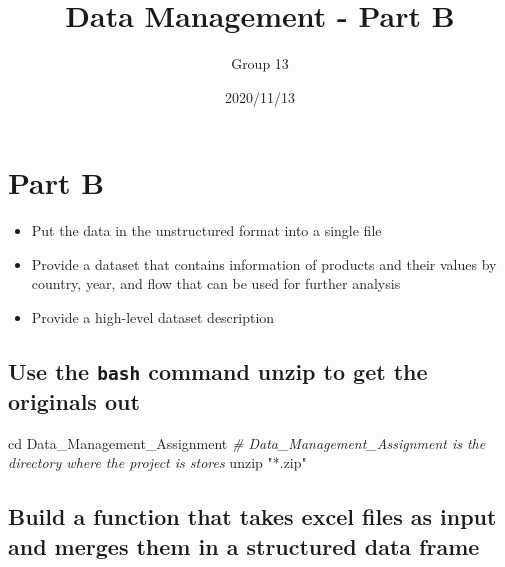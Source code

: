 \documentclass[
]{article}
\title{Data Management - Part B}
\author{Group 13}
\date{2020/11/13}
\newenvironment{Shaded}{\begin{snugshade}}{\end{snugshade}}
\newcommand{\BuiltInTok}[1]{#1}
\newcommand{\CommentTok}[1]{\textcolor[rgb]{0.56,0.35,0.01}{\textit{#1}}}
\newcommand{\FunctionTok}[1]{\textcolor[rgb]{0.00,0.00,0.00}{#1}}
\newcommand{\NormalTok}[1]{#1}
\newcommand{\StringTok}[1]{\textcolor[rgb]{0.31,0.60,0.02}{#1}}
\providecommand{\tightlist}{%
  \setlength{\itemsep}{0pt}\setlength{\parskip}{0pt}}
\begin{document}
\maketitle

{
\setcounter{tocdepth}{2}
\tableofcontents
}
\newpage

\hypertarget{part-b}{%
\section{Part B}\label{part-b}}

\begin{itemize}
\tightlist
\item
  Put the data in the unstructured format into a single file
\item
  Provide a dataset that contains information of products and their
  values by country, year, and flow that can be used for further
  analysis
\item
  Provide a high-level dataset description
\end{itemize}

\hypertarget{use-the-bash-command-unzip-to-get-the-originals-out}{%
\subsection{\texorpdfstring{Use the \texttt{bash} command unzip to get
the originals
out}{Use the bash command unzip to get the originals out}}\label{use-the-bash-command-unzip-to-get-the-originals-out}}

\begin{Shaded}
\begin{Highlighting}[]
\BuiltInTok{cd}\NormalTok{ Data_Management_Assignment }\CommentTok{# Data_Management_Assignment is the directory where the project is stores}
\FunctionTok{unzip} \StringTok{"*.zip"}
\end{Highlighting}
\end{Shaded}

\hypertarget{build-a-function-that-takes-excel-files-as-input-and-merges-them-in-a-structured-data-frame}{%
\subsection{Build a function that takes excel files as input and merges
them in a structured data
frame}\label{build-a-function-that-takes-excel-files-as-input-and-merges-them-in-a-structured-data-frame}}
\end{document}
